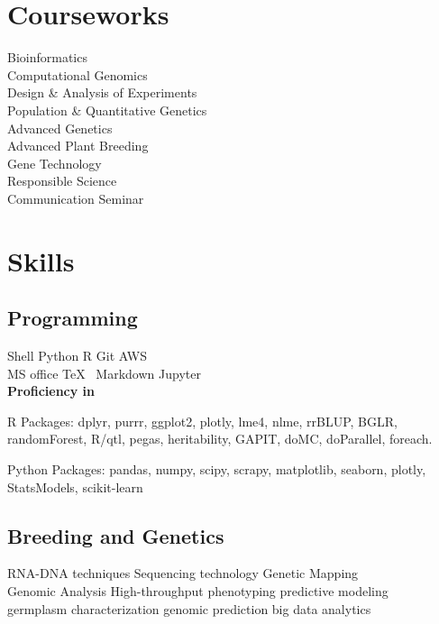 \documentclass[]{deedy-resume-openfont}
\begin{document}
\begin{minipage}[t]{0.31\textwidth}

\section{Courseworks}
Bioinformatics \\
Computational Genomics \\
Design \& Analysis of Experiments \\
Population \& Quantitative Genetics \\
Advanced Genetics \\
Advanced Plant Breeding \\
Gene Technology \\
Responsible Science \\
Communication Seminar \\

\section{Skills}
\subsection{Programming}
Shell \textbullet{} Python \textbullet{} R \textbullet{} Git \textbullet{} AWS \\
MS office \textbullet{} \TeX\ \textbullet{} Markdown \textbullet{} Jupyter \\ 
\sectionsep
\textbf{Proficiency in }
\vspace{\topsep}
\begin{tightemize}
\item R Packages: dplyr, purrr, ggplot2, plotly, lme4, nlme, rrBLUP, BGLR, randomForest, R/qtl, pegas, heritability, GAPIT, doMC, doParallel, foreach.
\item Python Packages: pandas, numpy, scipy, scrapy, matplotlib, seaborn, plotly, StatsModels, scikit-learn
\end{tightemize}
\sectionsep
\subsection{Breeding and Genetics}
RNA-DNA techniques \textbullet{} Sequencing technology \textbullet{}
Genetic Mapping \textbullet{} \\
Genomic Analysis \textbullet{}
High-throughput phenotyping \textbullet{} predictive modeling \textbullet{}\\
germplasm characterization \textbullet{} genomic prediction \textbullet{} big data analytics \\
\sectionsep


\end{minipage}
\end{document}
